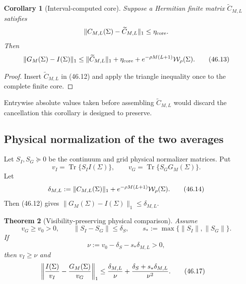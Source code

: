 \documentclass[11pt]{article}
\newtheorem{theorem}{Theorem}[section]
\newtheorem{corollary}[theorem]{Corollary}
\theoremstyle{remark}
\begin{document}
\begin{corollary}[Interval-computed core]
\label{cor:v12v46-interval-core}
Suppose a Hermitian finite matrix \(\widetilde C_{M,L}\) satisfies
\[
 \|C_{M,L}(\Sigma)-\widetilde C_{M,L}\|_1
 \leq\eta_{\rm core}.
\]
Then
\begin{equation}
 \|G_M(\Sigma)-I(\Sigma)\|_1
 \leq
 \|\widetilde C_{M,L}\|_1+\eta_{\rm core}
 +
 e^{-\rho M(L+1)}{\cal W}_\rho(\Sigma).           \tag{46.13}
\end{equation}
\end{corollary}

\begin{proof}
Insert \(\widetilde C_{M,L}\) in (46.12) and apply the triangle
inequality once to the complete finite core.
\end{proof}

Entrywise absolute values taken before assembling
\(\widetilde C_{M,L}\) would discard the cancellation this
corollary is designed to preserve.

\subsection{Physical normalization of the two averages}

Let \(S_I,S_G\succeq0\) be the continuum and grid physical
normalizer matrices.  Put
\[
 v_I=\operatorname{Tr}\{S_II(\Sigma)\},\qquad
 v_G=\operatorname{Tr}\{S_GG_M(\Sigma)\}.
\]
Let
\begin{equation}
 \delta_{M,L}:=
 \|C_{M,L}(\Sigma)\|_1
 +
 e^{-\rho M(L+1)}{\cal W}_\rho(\Sigma).           \tag{46.14}
\end{equation}
Then (46.12) gives
\(\|G_M(\Sigma)-I(\Sigma)\|_1\leq\delta_{M,L}\).

\begin{theorem}[Visibility-preserving physical comparison]
\label{thm:v12v46-physical}
Assume
\begin{equation}
 v_G\geq v_0>0,\qquad
 \|S_I-S_G\|\leq\delta_S,\qquad
 s_*:=\max\{\|S_I\|,\|S_G\|\}.                    \tag{46.15}
\end{equation}
If
\begin{equation}
 \nu:=
 v_0-\delta_S-s_*\delta_{M,L}>0,                 \tag{46.16}
\end{equation}
then \(v_I\geq\nu\) and
\begin{align}
 \left\|
 {I(\Sigma)\over v_I}
 -
 {G_M(\Sigma)\over v_G}
 \right\|_1
 \leq{}&
 {\delta_{M,L}\over\nu}
 +
 {\delta_S+s_*\delta_{M,L}\over\nu^2}.           \tag{46.17}
\end{align}
\end{theorem}
\end{document}

